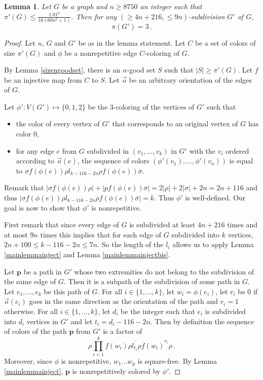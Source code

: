 \documentclass[a4paper,12pt]{article}
\newtheorem{lemma}{Lemma}
\newcommand{\pal}{\rho}
\newcommand{\hpal}{\sigma}
\begin{document}
\begin{lemma} \label{lemmaConstruction}
  Let $G$ be a graph and $n\ge 8750$ an integer such that $\pi'(G)\le \frac{1.01^{n}}{16(60n^2+1)}$.
  Then for any $(\ge 4n+216, \le 9n)$-subdivision $G'$ of $G$, 
  $$\pi(G')=3\,.$$  
\end{lemma}
\begin{proof}
Let $n$, $G$ and $G'$ be as in the lemma statement.
Let $C$ be a set of colors of size  $\pi'(G)$ and $\phi$ be a nonrepetitive edge $C$-coloring of $G$.

By Lemma \ref{sizengoodset}, there is an $n$-good set $S$ such that $|S|\ge\pi'(G)$.
Let $f$ be an injective map from $C$ to $S$. Let $\vec o$ be an arbitrary orientation of the edges of $G$.

Let $\phi':V(G')\mapsto \{0,1,2\}$ be the 3-coloring of the vertices of $G'$ such that 
\begin{itemize}
    \item the color of every vertex of $G'$ that corresponds to an original vertex of $G$ has color $0$,
    \item for any edge $e$ from $G$ subdivided in $(v_1,\ldots,v_k)$ in $G'$ with the $v_i$ ordered according to $\vec o(e)$, the sequence of colors $(\phi'(v_1),\ldots,\phi'(v_n))$ is equal to $\hpal f(\phi(e))\pal l_{k-116-2n}\pal f(\phi(e))\overline{\hpal}$.
\end{itemize}
Remark that $|\hpal f(\phi(e))\pal|+ |pf(\phi(e))\overline{\hpal} |= 2|\pal|+2|\hpal|+2n= 2n+116$ and thus 
$|\hpal f(\phi(e))\pal l_{k-116-2n}\pal f(\phi(e))\overline{\hpal}| =k$. Thus $\phi'$ is well-defined. Our goal is now to show that $\phi'$  is nonrepetitive.

First remark that since every edge of $G$ is subdivided at least $4n+216$ times and at most $9n$ times this implies that for each edge of $G$ subdivided into $k$ vertices, $2n+100\le k-116-2n\le 7n$. So the length of the $l_i$ allows us to apply Lemma \ref{mainlemmainject} and Lemma \ref{mainlemmainjectbis}.

Let $\mathbf{p}$ be a path in $G'$ whose two extremities do not belong to the subdivision of the same edge of $G$. Then it is a subpath of the subdivision of some path in $G$.
Let $e_1,\ldots, e_k$ be this path of $G$. For all $i\in\{1,\ldots, k\}$, let $w_i=\phi(e_i)$, let $r_i$ be $0$ if $\vec o (e_i)$ goes in the same direction as the orientation of the path and $r_i=1$ otherwise. For all $i\in\{1,\ldots, k\}$, let $d_i$ be the integer such that $e_i$ is subdivided into $d_i$ vertices in $G'$ and let $t_i= d_i -116-2n$. 
Then by definition the sequence of colors of the path $\mathbf{p}$ from $G'$ is a factor of
$$\pal\prod_{i=1}^k \overline {f(w_i)\pal l_{t_i}\pal f(w_i)}^{r_i}\pal\,.$$
Moreover, since $\phi$ is nonrepetitive, $w_1\ldots w_p$ is square-free. 
By Lemma \ref{mainlemmainject}, $\mathbf{p}$ is nonrepetitively colored by $\phi'$.


\end{proof}
\end{document}

